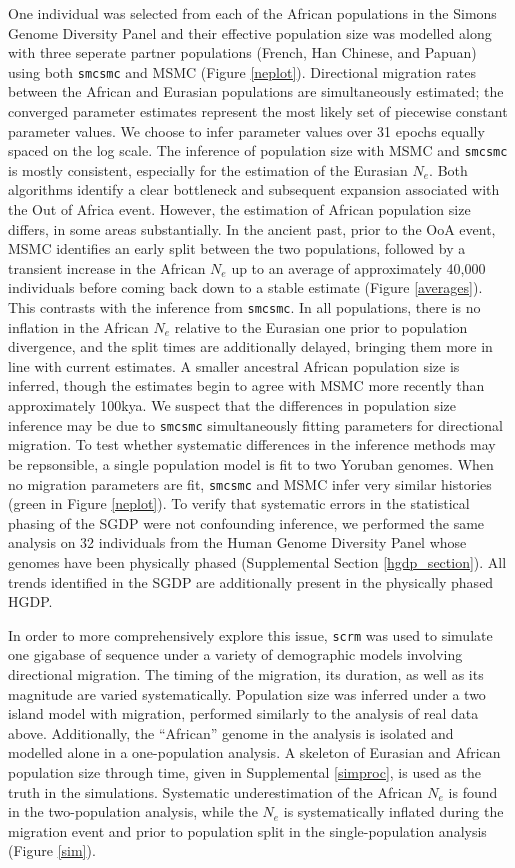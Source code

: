 \documentclass{article}
\begin{document}
One individual was selected from each of the African populations in the Simons Genome Diversity Panel and their effective population size was modelled along with three seperate partner populations (French, Han Chinese, and Papuan) using both {\tt smcsmc} and MSMC (Figure \ref{neplot}). Directional migration rates between the African and Eurasian populations are simultaneously estimated; the converged parameter estimates represent the most likely set of piecewise constant parameter values. We choose to infer parameter values over 31 epochs equally spaced on the log scale. The inference of population size with MSMC and {\tt smcsmc} is mostly consistent, especially for the estimation of the Eurasian $N_e$. Both algorithms identify a clear bottleneck and subsequent expansion associated with the Out of Africa event. However, the estimation of African population size differs, in some areas substantially. In the ancient past, prior to the OoA event, MSMC identifies an early split between the two populations, followed by a transient increase in the African $N_e$ up to an average of approximately 40,000 individuals before coming back down to a stable estimate (Figure \ref{averages}). This contrasts with the inference from {\tt smcsmc}. In all populations, there is no inflation in the African $N_e$ relative to the Eurasian one prior to population divergence, and the split times are additionally delayed, bringing them more in line with current estimates. A smaller ancestral African population size is inferred, though the estimates begin to agree with MSMC more recently than approximately 100kya. We suspect that the differences in population size inference may be due to {\tt smcsmc} simultaneously fitting parameters for directional migration. To test whether systematic differences in the inference methods may be repsonsible, a single population model is fit to two Yoruban genomes. When no migration parameters are fit, {\tt smcsmc} and MSMC infer very similar histories (green in Figure \ref{neplot}). To verify that systematic errors in the statistical phasing of the SGDP were not confounding inference, we performed the same analysis on 32 individuals from the Human Genome Diversity Panel whose genomes have been physically phased (Supplemental Section \ref{hgdp_section}). All trends identified in the SGDP are additionally present in the physically phased HGDP.   

In order to more comprehensively explore this issue, {\tt scrm} was used to simulate one gigabase of sequence under a variety of demographic models involving directional migration. The timing of the migration, its duration, as well as its magnitude are varied systematically. Population size was inferred under a two island model with migration, performed similarly to the analysis of real data above. Additionally, the ``African'' genome in the analysis is isolated and modelled alone in a one-population analysis. A skeleton of Eurasian and African population size through time, given in Supplemental \ref{simproc}, is used as the truth in the simulations. Systematic underestimation of the African $N_e$ is found in the two-population analysis, while the $N_e$ is systematically inflated during the migration event and prior to population split in the single-population analysis (Figure \ref{sim}). 
\end{document}
